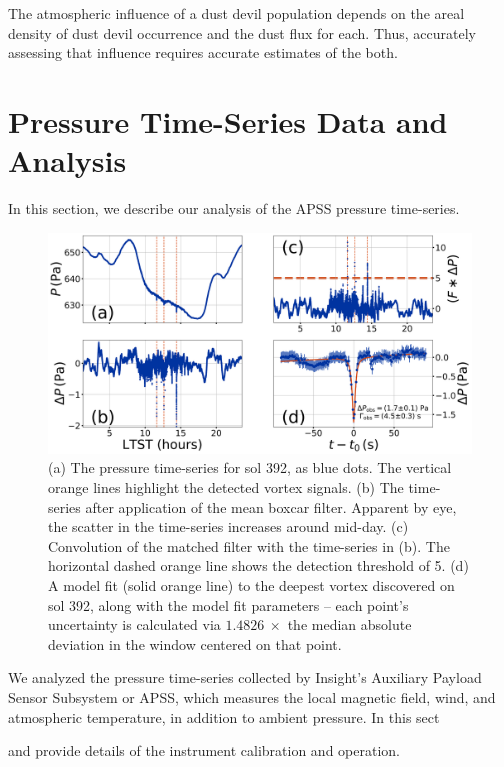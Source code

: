 \documentclass{aastex63}
\begin{document}

The atmospheric influence of a dust devil population depends on the areal density of dust devil occurrence and the dust flux for each. Thus, accurately assessing that influence requires accurate estimates of the both.

\section{Pressure Time-Series Data and Analysis}
In this section, we describe our analysis of the APSS pressure time-series. 

\begin{figure}
    \centering
    \includegraphics[width=\textwidth]{figures/data_conditioning_and_fit.png}
    \caption{(a) The pressure time-series for sol 392, as blue dots. The vertical orange lines highlight the detected vortex signals. (b) The time-series after application of the mean boxcar filter. Apparent by eye, the scatter in the time-series increases around mid-day. (c) Convolution of the matched filter with the time-series in (b). The horizontal dashed orange line shows the detection threshold of 5. (d) A model fit (solid orange line) to the deepest vortex discovered on sol 392, along with the model fit parameters -- each point's uncertainty is calculated via $1.4826\ \times$ the median absolute deviation in the window centered on that point.}
    \label{fig:data_conditioning_and_fit}
\end{figure}

We analyzed the pressure time-series collected by Insight's Auxiliary Payload Sensor Subsystem or APSS, which measures the local magnetic field, wind, and atmospheric temperature, in addition to ambient pressure. In this sect

\citet{2018SSRv..214..109S} and \citet{2020NatGe..13..190B} provide details of the instrument calibration and operation. 
\end{document}
